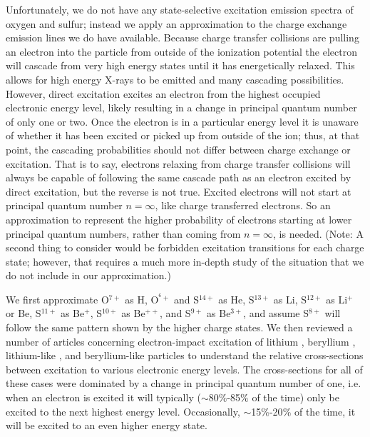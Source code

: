 \documentclass[draft]{agujournal2018}
\begin{document}
Unfortunately, we do not have any state-selective excitation emission spectra of oxygen and sulfur; instead we apply an approximation to the charge exchange emission lines we do have available.
Because charge transfer collisions are pulling an electron into the particle from outside of the ionization potential the electron will cascade from very high energy states until it has energetically relaxed.
This allows for high energy X-rays to be emitted and many cascading possibilities.
However, direct excitation excites an electron from the highest occupied electronic energy level, likely resulting in a change in principal quantum number of only one or two.
Once the electron is in a particular energy level it is unaware of whether it has been excited or picked up from outside of the ion; thus, at that point, the cascading probabilities should not differ between charge exchange or excitation.
That is to say, electrons relaxing from charge transfer collisions will always be capable of following the same cascade path as an electron excited by direct excitation, but the reverse is not true.
Excited electrons will not start at principal quantum number $n=\infty$, like charge transferred electrons.
So an approximation to represent the higher probability of electrons starting at lower principal quantum numbers, rather than coming from $n=\infty$, is needed.
(Note: A second thing to consider would be forbidden excitation transitions for each charge state; however, that requires a much more in-depth study of the situation that we do not include in our approximation.)

We first approximate O$^{7+}$ as H, O$^{^6+}$ and S$^{14+}$ as He, S$^{13+}$ as Li, S$^{12+}$ as Li$^{+}$ or Be, S$^{11+}$ as Be$^{+}$, S$^{10+}$ as Be$^{++}$, and S$^{9+}$ as Be$^{3+}$, and assume S$^{8+}$ will follow the same pattern shown by the higher charge states.
We then reviewed a number of articles concerning electron-impact excitation of lithium \citep{griffin2001}, beryllium \citep{bartschat1996}, lithium-like \citep{bely1966}, and beryllium-like \citep{ballance2003} particles to understand the relative cross-sections between excitation to various electronic energy levels.
The cross-sections for all of these cases were dominated by a change in principal quantum number of one, i.e. when an electron is excited it will typically ($\sim$80$\%$-85$\%$ of the time) only be excited to the next highest energy level.
Occasionally, $\sim$15$\%$-20$\%$  of the time, it will be excited to an even higher energy state.
\end{document}
